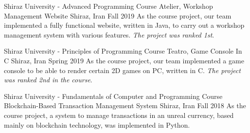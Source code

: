 \begin{cventries}
  \cventry
    {Shiraz University - Advanced Programming Course} %
    {Atelier, Workshop Management Website} %
    {Shiraz, Iran} %
    {Fall 2019} %
    {
      As the course project, our team implemented a fully functional website, written in Java, to carry out a workshop management system with various features. \emph{The project was ranked 1st}.
    }

  \cventry
    {Shiraz University - Principles of Programming Course} %
    {Teatro, Game Console In C} %
    {Shiraz, Iran} %
    {Spring 2019} %
    {
      As the course project, our team implemented a game console to be able to render certain 2D games on PC, written in C. \emph{The project was ranked 2nd in the course}.
    }

  \cventry
    {Shiraz University - Fundamentals of Computer and Programming Course} %
    {Blockchain-Based Transaction Management System} %
    {Shiraz, Iran} %
    {Fall 2018} %
    {
      As the course project, a system to manage transactions in an unreal currency, based mainly on blockchain technology, was implemented in Python.
    }

\end{cventries}
